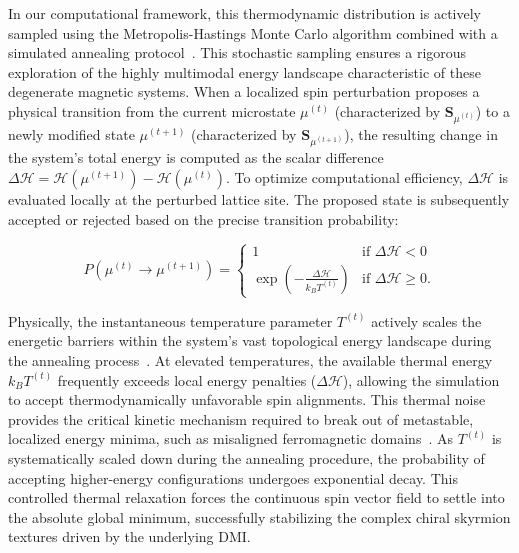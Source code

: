 \documentclass[letterpaper, 12, one column]{article}
\begin{document}
In our computational framework, this thermodynamic distribution is actively sampled using the Metropolis-Hastings Monte Carlo algorithm combined with a simulated annealing protocol~\cite{landau2021guide}. This stochastic sampling ensures a rigorous exploration of the highly multimodal energy landscape characteristic of these degenerate magnetic systems. When a localized spin perturbation proposes a physical transition from the current microstate $\mu^{(t)}$ (characterized by $\mathbf{S}_{\mu^{(t)}}$) to a newly modified state $\mu^{(t+1)}$ (characterized by $\mathbf{S}_{\mu^{(t+1)}}$), the resulting change in the system's total energy is computed as the scalar difference $\Delta \mathcal{H} = \mathcal{H}(\mu^{(t+1)}) - \mathcal{H}(\mu^{(t)})$. To optimize computational efficiency, $\Delta \mathcal{H}$ is evaluated locally at the perturbed lattice site. The proposed state is subsequently accepted or rejected based on the precise transition probability:

\begin{equation}\label{eq:Metropolis}
P(\mu^{(t)} \rightarrow \mu^{(t+1)}) = \begin{cases}
1 & \text{if } \Delta \mathcal{H} < 0 \\
\exp\left(-\frac{\Delta \mathcal{H}}{k_B T^{(t)}}\right) & \text{if } \Delta \mathcal{H} \geq 0.
\end{cases}
\end{equation}

Physically, the instantaneous temperature parameter $T^{(t)}$ actively scales the energetic barriers within the system's vast topological energy landscape during the annealing process~\cite{landau2021guide}. At elevated temperatures, the available thermal energy $k_B T^{(t)}$ frequently exceeds local energy penalties ($\Delta \mathcal{H}$), allowing the simulation to accept thermodynamically unfavorable spin alignments. This thermal noise provides the critical kinetic mechanism required to break out of metastable, localized energy minima, such as misaligned ferromagnetic domains~\cite{desplat2018thermal}. As $T^{(t)}$ is systematically scaled down during the annealing procedure, the probability of accepting higher-energy configurations undergoes exponential decay. This controlled thermal relaxation forces the continuous spin vector field to settle into the absolute global minimum, successfully stabilizing the complex chiral skyrmion textures driven by the underlying DMI.
\end{document}
